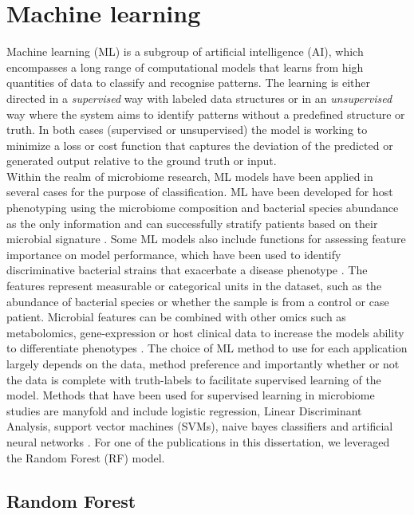 \section{Machine learning}

Machine learning (ML) is a subgroup of artificial intelligence (AI), which encompasses a long range of computational models that learns from high quantities of data to classify and recognise patterns. The learning is either directed in a \textit{supervised} way with labeled data structures or in an \textit{unsupervised} way where the system aims to identify patterns without a predefined structure or truth. In both cases (supervised or unsupervised) the model is working to minimize a loss or cost function that captures the deviation of the predicted or generated output relative to the ground truth or input.\\

\noindent
Within the realm of microbiome research, ML models have been applied in several cases for the purpose of classification. ML have been developed for host phenotyping using the microbiome composition and bacterial species abundance as the only information and can successfully stratify patients based on their microbial signature \cite{Pasolli2016-pi,Statnikov2013-gz}. Some ML models also include functions for assessing feature importance on model performance, which have been used to identify discriminative bacterial strains that exacerbate a disease phenotype \cite{Pasolli2016-pi}. The features represent measurable or categorical units in the dataset, such as the abundance of bacterial species or whether the sample is from a control or case patient. Microbial features can be combined with other omics such as metabolomics, gene-expression or host clinical data to increase the models ability to differentiate phenotypes \cite{Zhou2019-nc}. The choice of ML method to use for each application largely depends on the data, method preference and importantly whether or not the data is complete with truth-labels to facilitate supervised learning of the model. Methods that have been used for supervised learning in microbiome studies are manyfold and include logistic regression, Linear Discriminant Analysis, support vector machines (SVMs), naive bayes classifiers and artificial neural networks \cite{Marcos-Zambrano2021-eg}. For one of the publications in this dissertation, we leveraged the Random Forest (RF) model.

\subsection{Random Forest}

